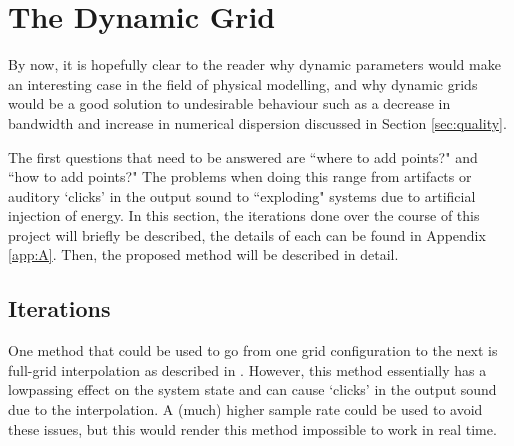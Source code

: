 \documentclass[dvipsnames, reprint]{JASA}
\begin{document}
\section{The Dynamic Grid}
By now, it is hopefully clear to the reader why dynamic parameters would make an interesting case in the field of physical modelling, and why dynamic grids would be a good solution to undesirable behaviour such as a decrease in bandwidth and increase in numerical dispersion discussed in Section \ref{sec:quality}. %

The first questions that need to be answered are ``where to add points?" and ``how to add points?" The problems when doing this range from artifacts or auditory `clicks' in the output sound to ``exploding" systems due to artificial injection of energy. In this section, the iterations done over the course of this project will briefly be described, the details of each can be found in Appendix \ref{app:A}. Then, the proposed method will be described in detail.


\subsection{Iterations}\label{sec:iterations}
One method that could be used to go from one grid configuration to the next is full-grid interpolation as described in \cite[Chap. 5]{bilbao2009}. However, this method essentially has a lowpassing effect on the system state and can cause `clicks' in the output sound due to the interpolation. A (much) higher sample rate could be used to avoid these issues, but this would render this method impossible to work in real time.
\end{document}
